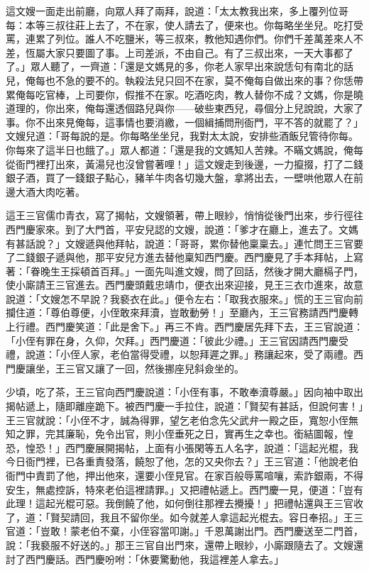 這文嫂一面走出前廳，向眾人拜了兩拜，說道：「太太教我出來，多上覆列位哥每：本等三叔往莊上去了，不在家，使人請去了，便來也。你每略坐坐兒。吃打受罵，連累了列位。誰人不吃鹽米，等三叔來，教他知遇你們。你們千差萬差來人不差，恆屬大家只要圖了事。上司差派，不由自己。有了三叔出來，一天大事都了了。」眾人聽了，一齊道：「還是文媽見的多，你老人家早出來說恁句有南北的話兒，俺每也不急的要不的。執殺法兒只回不在家，莫不俺每自做出來的事？你恁帶累俺每吃官棒，上司要你，假推不在家。吃酒吃肉，教人替你不成？文媽，你是曉道理的，你出來，俺每還透個路兒與你——破些東西兒，尋個分上兒說說，大家了事。你不出來見俺每，這事情也要消繳，一個緝捕問刑衙門，平不答的就罷了？」文嫂兒道：「哥每說的是。你每略坐坐兒，我對太太說，安排些酒飯兒管待你每。你每來了這半日也餓了。」眾人都道：「還是我的文媽知人苦辣。不瞞文媽說，俺每從衙門裡打出來，黃湯兒也沒曾嘗著哩！」這文嫂走到後邊，一力攛掇，打了二錢銀子酒，買了一錢銀子點心，豬羊牛肉各切幾大盤，拿將出去，一壁哄他眾人在前邊大酒大肉吃著。

這王三官儒巾青衣，寫了揭帖，文嫂領著，帶上眼紗，悄悄從後門出來，步行徑往西門慶家來。到了大門首，平安兒認的文嫂，說道：「爹才在廳上，進去了。文媽有甚話說？」文嫂遞與他拜帖，說道：「哥哥，累你替他稟稟去。」連忙問王三官要了二錢銀子遞與他，那平安兒方進去替他稟知西門慶。西門慶見了手本拜帖，上寫著：「眷晚生王採頓首百拜。」一面先叫進文嫂，問了回話，然後才開大廳槅子門，使小廝請王三官進去。西門慶頭戴忠靖巾，便衣出來迎接，見王三衣巾進來，故意說道：「文嫂怎不早說？我褻衣在此。」便令左右：「取我衣服來。」慌的王三官向前攔住道：「尊伯尊便，小侄敢來拜瀆，豈敢動勞！」至廳內，王三官務請西門慶轉上行禮。西門慶笑道：「此是舍下。」再三不肯。西門慶居先拜下去，王三官說道：「小侄有罪在身，久仰，欠拜。」西門慶道：「彼此少禮。」王三官因請西門慶受禮，說道：「小侄人家，老伯當得受禮，以恕拜遲之罪。」務讓起來，受了兩禮。西門慶讓坐，王三官又讓了一回，然後挪座兒斜僉坐的。

少頃，吃了茶，王三官向西門慶說道：「小侄有事，不敢奉瀆尊嚴。」因向袖中取出揭帖遞上，隨即離座跪下。被西門慶一手拉住，說道：「賢契有甚話，但說何害！」王三官就說：「小侄不才，誠為得罪，望乞老伯念先父武弁一殿之臣，寬恕小侄無知之罪，完其廉恥，免令出官，則小侄垂死之日，實再生之幸也。銜結圖報，惶恐，惶恐！」西門慶展開揭帖，上面有小張閑等五人名字，說道：「這起光棍，我今日衙門裡，已各重責發落，饒恕了他，怎的又央你去？」王三官道：「他說老伯衙門中責罰了他，押出他來，還要小侄見官。在家百般辱罵喧嚷，索詐銀兩，不得安生，無處控訴，特來老伯這裡請罪。」又把禮帖遞上。西門慶一見，便道：「豈有此理！這起光棍可惡。我倒饒了他，如何倒往那裡去攪擾！」把禮帖還與王三官收了，道：「賢契請回，我且不留你坐。如今就差人拿這起光棍去。容日奉招。」王三官道：「豈敢！蒙老伯不棄，小侄容當叩謝。」千恩萬謝出門。西門慶送至二門首，說：「我褻服不好送的。」那王三官自出門來，還帶上眼紗，小廝跟隨去了。文嫂還討了西門慶話。西門慶吩咐：「休要驚動他，我這裡差人拿去。」

